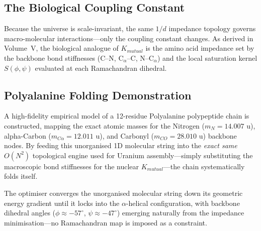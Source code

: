 \subsection{The Biological Coupling Constant}

Because the universe is scale-invariant, the same $1/d$ impedance topology governs macro-molecular interactions---only the coupling constant changes. As derived in Volume~V, the biological analogue of $K_{mutual}$ is the amino acid impedance set by the backbone bond stiffnesses (C--N, C$_\alpha$--C, N--C$_\alpha$) and the local saturation kernel $S(\phi, \psi)$ evaluated at each Ramachandran dihedral.

\subsection{Polyalanine Folding Demonstration}

A high-fidelity empirical model of a 12-residue Polyalanine polypeptide chain is constructed, mapping the exact atomic masses for the Nitrogen ($m_N = 14.007$ u), alpha-Carbon ($m_{C\alpha} = 12.011$ u), and Carbonyl ($m_{CO} = 28.010$ u) backbone nodes. By feeding this unorganised 1D molecular string into the \textit{exact same} $O(N^2)$ topological engine used for Uranium assembly---simply substituting the macroscopic bond stiffnesses for the nuclear $K_{mutual}$---the chain systematically folds itself.


The optimiser converges the unorganised molecular string down its geometric energy gradient until it locks into the $\alpha$-helical configuration, with backbone dihedral angles ($\phi \approx -57^\circ$, $\psi \approx -47^\circ$) emerging naturally from the impedance minimisation---no Ramachandran map is imposed as a constraint.

